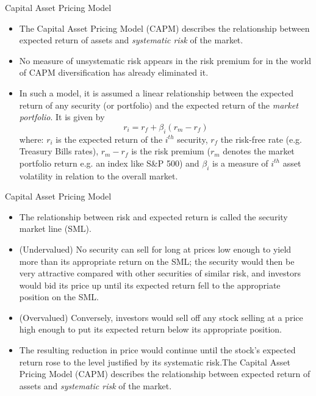 \documentclass{beamer}
\begin{document}
\begin{frame}{Capital Asset Pricing Model}
  \begin{itemize}
  \item The Capital Asset Pricing Model (CAPM) describes the relationship between expected return of assets and \emph{systematic risk} of the market.
  \item No measure of unsystematic risk appears in the risk premium for in the world of CAPM diversification has already eliminated it.
  \item In such a model, it is assumed a linear relationship between the expected return of any security (or portfolio) and the expected return of the \emph{market portfolio}. It is given by
    \begin{equation*}
      r_i = r_f + \beta_i(r_m-r_f)
    \end{equation*}
    where: $r_i$ is the expected return of the $i^{th}$ security, $r_f$ the risk-free rate (e.g. Treasury Bills rates), $r_m - r_f$ is the risk premium ($r_m$ denotes the market portfolio return e.g. an index like S\&P 500) and $\beta_i$ is a measure of $i^{th}$ asset volatility in relation to the overall market.
  \end{itemize}
\end{frame}

\begin{frame}{Capital Asset Pricing Model}
  \begin{itemize}
  \item The relationship between risk and expected return is called the security market line (SML).
  \item (Undervalued) No security can sell for long at prices low enough to yield more than its appropriate return on the SML; the security would then be very attractive compared with other securities of similar risk, and investors would bid its price up until its expected return fell to the appropriate position on the SML.
  \item (Overvalued) Conversely, investors would sell off any stock selling at a price high enough to put its expected return below its appropriate position. 
  \item The resulting reduction in price would continue until the stock’s expected return rose to the level justified by its systematic risk.The Capital Asset Pricing Model (CAPM) describes the relationship between expected return of assets and \emph{systematic risk} of the market.
  \end{itemize}
\end{frame}
\end{document}
